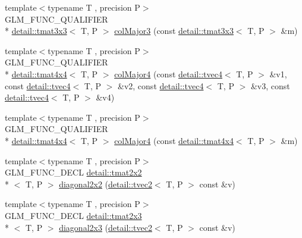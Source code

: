 \begin{DoxyCompactItemize}
\item 
{\footnotesize template$<$typename T , precision P$>$ }\\G\-L\-M\-\_\-\-F\-U\-N\-C\-\_\-\-Q\-U\-A\-L\-I\-F\-I\-E\-R \\*
\hyperlink{structglm_1_1detail_1_1tmat3x3}{detail\-::tmat3x3}$<$ T, P $>$ \hyperlink{group__gtx__matrix__major__storage_ga40caccd20b8afb6de68c626efc376927}{col\-Major3} (const \hyperlink{structglm_1_1detail_1_1tmat3x3}{detail\-::tmat3x3}$<$ T, P $>$ \&m)
\item 
{\footnotesize template$<$typename T , precision P$>$ }\\G\-L\-M\-\_\-\-F\-U\-N\-C\-\_\-\-Q\-U\-A\-L\-I\-F\-I\-E\-R \\*
\hyperlink{structglm_1_1detail_1_1tmat4x4}{detail\-::tmat4x4}$<$ T, P $>$ \hyperlink{group__gtx__matrix__major__storage_ga50e127c56370410d8054be2cdef03503}{col\-Major4} (const \hyperlink{structglm_1_1detail_1_1tvec4}{detail\-::tvec4}$<$ T, P $>$ \&v1, const \hyperlink{structglm_1_1detail_1_1tvec4}{detail\-::tvec4}$<$ T, P $>$ \&v2, const \hyperlink{structglm_1_1detail_1_1tvec4}{detail\-::tvec4}$<$ T, P $>$ \&v3, const \hyperlink{structglm_1_1detail_1_1tvec4}{detail\-::tvec4}$<$ T, P $>$ \&v4)
\item 
{\footnotesize template$<$typename T , precision P$>$ }\\G\-L\-M\-\_\-\-F\-U\-N\-C\-\_\-\-Q\-U\-A\-L\-I\-F\-I\-E\-R \\*
\hyperlink{structglm_1_1detail_1_1tmat4x4}{detail\-::tmat4x4}$<$ T, P $>$ \hyperlink{group__gtx__matrix__major__storage_ga89086c0396205669304be98a8c601b78}{col\-Major4} (const \hyperlink{structglm_1_1detail_1_1tmat4x4}{detail\-::tmat4x4}$<$ T, P $>$ \&m)
\item 
{\footnotesize template$<$typename T , precision P$>$ }\\G\-L\-M\-\_\-\-F\-U\-N\-C\-\_\-\-D\-E\-C\-L \hyperlink{structglm_1_1detail_1_1tmat2x2}{detail\-::tmat2x2}\\*
$<$ T, P $>$ \hyperlink{group__gtx__matrix__operation_gae4177a43a89e6b4b7352f82198f2ea84}{diagonal2x2} (\hyperlink{structglm_1_1detail_1_1tvec2}{detail\-::tvec2}$<$ T, P $>$ const \&v)
\item 
{\footnotesize template$<$typename T , precision P$>$ }\\G\-L\-M\-\_\-\-F\-U\-N\-C\-\_\-\-D\-E\-C\-L \hyperlink{structglm_1_1detail_1_1tmat2x3}{detail\-::tmat2x3}\\*
$<$ T, P $>$ \hyperlink{group__gtx__matrix__operation_ga873468c41cb29fb84a12a866549e0136}{diagonal2x3} (\hyperlink{structglm_1_1detail_1_1tvec2}{detail\-::tvec2}$<$ T, P $>$ const \&v)

\end{DoxyCompactItemize}
